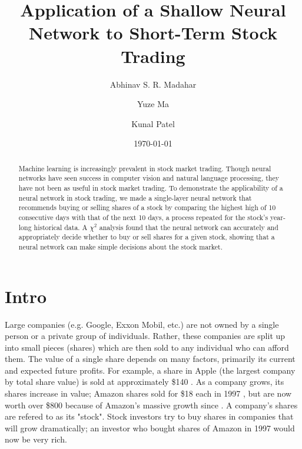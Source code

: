 \documentclass[twocolumn]{article}
\begin{document}
\date{\today}

\title{Application of a Shallow Neural Network to Short-Term Stock Trading}

\author[1]{Abhinav S. R. Madahar}
\author[2]{Yuze Ma}
\author[3]{Kunal Patel}

\maketitle

\begin{abstract}
Machine learning is increasingly prevalent in stock market trading. Though neural networks have seen success in computer vision and natural language processing, they have not been as useful in stock market trading. To demonstrate the applicability of a neural network in stock trading, we made a single-layer neural network that recommends buying or selling shares of a stock by comparing the highest high of 10 consecutive days with that of the next 10 days, a process repeated for the stock's year-long historical data. A $\chi^2$ analysis found that the neural network can accurately and appropriately decide whether to buy or sell shares for a given stock, showing that a neural network can make simple decisions about the stock market.
\end{abstract}

\section{Intro}


Large companies (e.g. Google, Exxon Mobil, etc.) are not owned by a single person or a private group of individuals. Rather, these companies are split up into small pieces (shares) which are then sold to any individual who can afford them. The value of a single share depends on many factors, primarily its current and expected future profits. For example, a share in Apple (the largest company by total share value) is sold at approximately \$140 \cite{yahooapple}. As a company grows, its shares increase in value; Amazon shares sold for \$18 each in 1997 \cite{investopedia}, but are now worth over \$800 because of Amazon's massive growth since \cite{yahooamazon}. A company's shares are refered to as its "stock". Stock investors try to buy shares in companies that will grow dramatically; an investor who bought shares of Amazon in 1997 would now be very rich.
\end{document}
